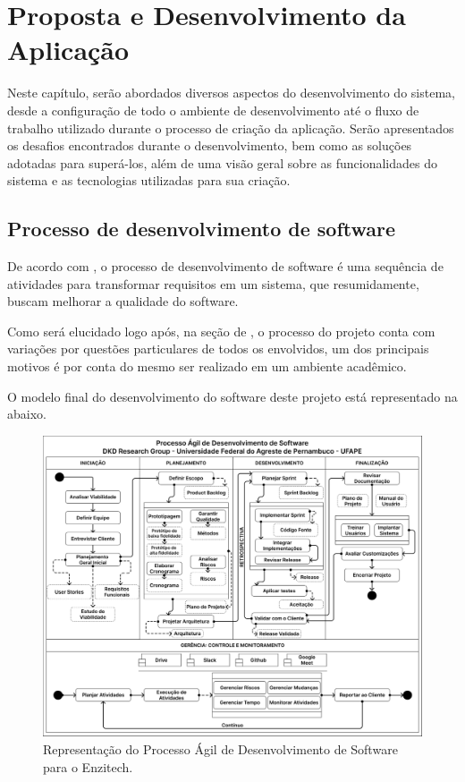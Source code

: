 \chapter{Proposta e Desenvolvimento da Aplicação}\label{ch:proposta}
Neste capítulo, serão abordados diversos aspectos do desenvolvimento do sistema, desde a configuração de todo o ambiente de desenvolvimento até o fluxo de trabalho utilizado durante o processo de criação da aplicação. Serão apresentados os desafios encontrados durante o desenvolvimento, bem como as soluções adotadas para superá-los, além de uma visão geral sobre as funcionalidades do sistema e as tecnologias utilizadas para sua criação.

\section{Processo de desenvolvimento de software}
De acordo com \cite{sommerville2011software}, o processo de desenvolvimento de software é uma sequência de atividades para transformar requisitos em um sistema, que resumidamente, buscam melhorar a qualidade do software.

Como será elucidado logo após, na seção de , o processo do projeto conta com variações por questões particulares de todos os envolvidos, um dos principais motivos é por conta do mesmo ser realizado em um ambiente acadêmico. 

O modelo final do desenvolvimento do software deste projeto está representado na  abaixo.

\begin{figure}[H]
\centering
  \includegraphics[width=\columnwidth]{images/processo_agil.pdf}
  \caption{Representação do Processo Ágil de Desenvolvimento de Software para o Enzitech.}
  \label{fig:processo_agil}
\end{figure}


